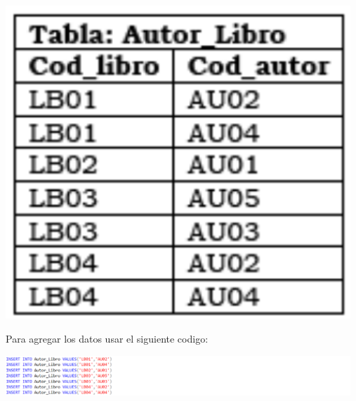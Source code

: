 \documentclass{article}
\begin{document}
\begin{enumerate}[\tab 1.]
\begin{itemize}
            \begin{center}
                \includegraphics[width=13cm]{./images/6.png}
            \end{center}
            Para agregar los datos usar el siguiente codigo:
            \begin{center}
                \includegraphics[width=13cm]{./images/6.1.png}
            \end{center}
        \end{itemize}
        \newpage
    \end{enumerate}
    
\end{document}
